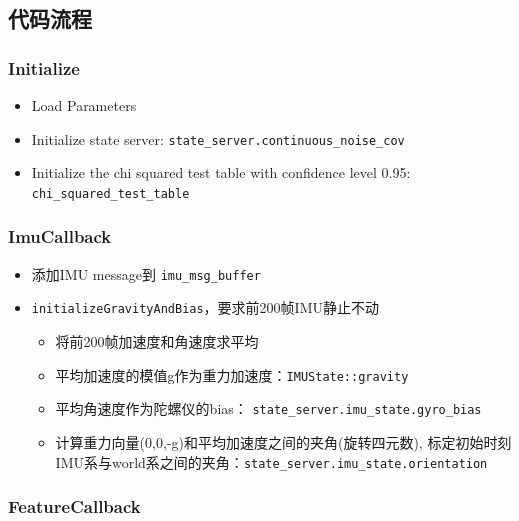 \documentclass[12pt,a4paper]{article}
\begin{document}
\subsection{代码流程}

\subsubsection{Initialize}

\begin{itemize}
\item Load Parameters
\item Initialize state server: \verb|state_server.continuous_noise_cov|
\item Initialize the chi squared test table with confidence level 0.95: \verb|chi_squared_test_table|
\end{itemize}

\subsubsection{ImuCallback}

\begin{itemize}

\item 添加IMU message到 \verb|imu_msg_buffer|

\item \verb|initializeGravityAndBias|，要求前200帧IMU静止不动

\begin{itemize}
\item 将前200帧加速度和角速度求平均
\item 平均加速度的模值g作为重力加速度：\verb|IMUState::gravity|
\item 平均角速度作为陀螺仪的bias： \verb|state_server.imu_state.gyro_bias|
\item 计算重力向量(0,0,-g)和平均加速度之间的夹角(旋转四元数), 标定初始时刻IMU系与world系之间的夹角：\verb|state_server.imu_state.orientation|
\end{itemize}

\end{itemize}

\subsubsection{FeatureCallback}
\end{document}
